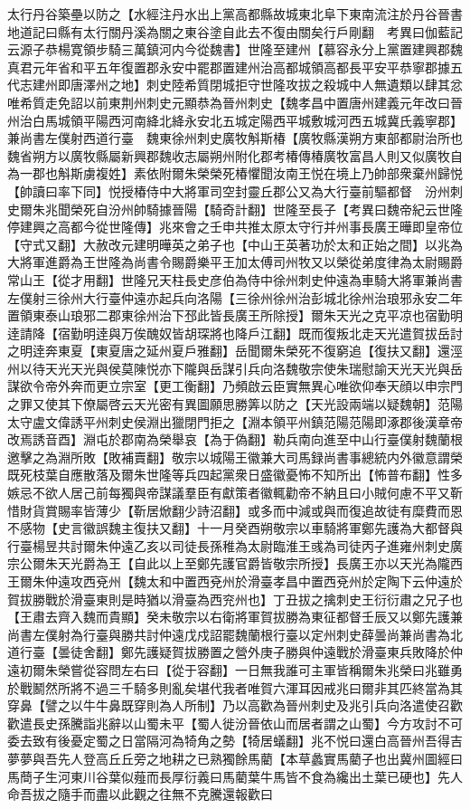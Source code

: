 太行丹谷築壘以防之【水經注丹水出上黨高都縣故城東北阜下東南流注於丹谷晉書地道記曰縣有太行關丹溪為關之東谷塗自此去不復由關矣行戶剛翻　考異曰伽藍記云源子恭楊寛領步騎三萬鎮河内今從魏書】世隆至建州【慕容永分上黨置建興郡魏真君元年省和平五年復置郡永安中罷郡置建州治高都城領高都長平安平恭寧郡據五代志建州即唐澤州之地】刺史陸希質閉城拒守世隆攻拔之殺城中人無遺類以肆其忿唯希質走免詔以前東荆州刺史元顯恭為晉州刺史【魏孝昌中置唐州建義元年改曰晉州治白馬城領平陽西河南絳北絳永安北五城定陽西平城敷城河西五城冀氏義寧郡】兼尚書左僕射西道行臺　魏東徐州刺史廣牧斛斯椿【廣牧縣漢朔方東部都尉治所也魏省朔方以廣牧縣屬新興郡魏收志屬朔州附化郡考椿傳椿廣牧富昌人則又似廣牧自為一郡也斛斯虜複姓】素依附爾朱榮榮死椿懼聞汝南王悦在境上乃帥部衆棄州歸悦【帥讀曰率下同】悦授椿侍中大將軍司空封靈丘郡公又為大行臺前驅都督　汾州刺史爾朱兆聞榮死自汾州帥騎據晉陽【騎奇計翻】世隆至長子【考異曰魏帝紀云世隆停建興之高都今從世隆傳】兆來會之壬申共推太原太守行并州事長廣王曄即皇帝位【守式又翻】大赦改元建明曄英之弟子也【中山王英著功於太和正始之間】以兆為大將軍進爵為王世隆為尚書令賜爵樂平王加太傅司州牧又以榮從弟度律為太尉賜爵常山王【從才用翻】世隆兄天柱長史彦伯為侍中徐州刺史仲遠為車騎大將軍兼尚書左僕射三徐州大行臺仲遠亦起兵向洛陽【三徐州徐州治彭城北徐州治琅邪永安二年置領東泰山琅邪二郡東徐州治下邳此皆長廣王所除授】爾朱天光之克平凉也宿勤明逹請降【宿勤明逹與万俟醜奴皆胡琛將也降戶江翻】既而復叛北走天光遣賀拔岳討之明逹奔東夏【東夏唐之延州夏戶雅翻】岳聞爾朱榮死不復窮追【復扶又翻】還涇州以待天光天光與侯莫陳悦亦下隴與岳謀引兵向洛魏敬宗使朱瑞慰諭天光天光與岳謀欲令帝外奔而更立宗室【更工衡翻】乃頻啟云臣實無異心唯欲仰奉天顔以申宗門之罪又使其下僚屬啓云天光密有異圖願思勝筭以防之【天光設兩端以疑魏朝】范陽太守盧文偉誘平州刺史侯淵出獵閉門拒之【淵本領平州鎮范陽范陽即涿郡後漢章帝改焉誘音酉】淵屯於郡南為榮舉哀【為于偽翻】勒兵南向進至中山行臺僕射魏蘭根邀擊之為淵所敗【敗補賣翻】敬宗以城陽王徽兼大司馬録尚書事總統内外徽意謂榮既死枝葉自應散落及爾朱世隆等兵四起黨衆日盛徽憂怖不知所出【怖普布翻】性多嫉忌不欲人居己前每獨與帝謀議羣臣有獻策者徽輒勸帝不納且曰小賊何慮不平又靳惜財貨賞賜率皆薄少【靳居焮翻少詩沼翻】或多而中減或與而復追故徒有糜費而恩不感物【史言徽誤魏主復扶又翻】十一月癸酉朔敬宗以車騎將軍鄭先護為大都督與行臺楊昱共討爾朱仲遠乙亥以司徒長孫稚為太尉臨淮王彧為司徒丙子進雍州刺史廣宗公爾朱天光爵為王【自此以上至鄭先護官爵皆敬宗所授】長廣王亦以天光為隴西王爾朱仲遠攻西兗州【魏太和中置西兗州於滑臺孝昌中置西兗州於定陶下云仲遠於賀拔勝戰於滑臺東則是時猶以滑臺為西兖州也】丁丑拔之擒刺史王衍衍肅之兄子也【王肅去齊入魏而貴顯】癸未敬宗以右衛將軍賀拔勝為東征都督壬辰又以鄭先護兼尚書左僕射為行臺與勝共討仲遠戊戍詔罷魏蘭根行臺以定州刺史薛曇尚兼尚書為北道行臺【曇徒舍翻】鄭先護疑賀拔勝置之營外庚子勝與仲遠戰於滑臺東兵敗降於仲遠初爾朱榮嘗從容問左右曰【從于容翻】一日無我誰可主軍皆稱爾朱兆榮曰兆雖勇於戰鬭然所將不過三千騎多則亂矣堪代我者唯賀六渾耳因戒兆曰爾非其匹終當為其穿鼻【譬之以牛牛鼻既穿則為人所制】乃以高歡為晉州刺史及兆引兵向洛遣使召歡歡遣長史孫騰詣兆辭以山蜀未平【蜀人徙汾晉依山而居者謂之山蜀】今方攻討不可委去致有後憂定蜀之日當隔河為犄角之勢【犄居蟻翻】兆不悦曰還白高晉州吾得吉夢夢與吾先人登高丘丘旁之地耕之已熟獨餘馬藺【本草蠡實馬藺子也出冀州圖經曰馬蕳子生河東川谷葉似薤而長厚衍義曰馬藺葉牛馬皆不食為纔出土葉已硬也】先人命吾拔之隨手而盡以此觀之往無不克騰還報歡曰
